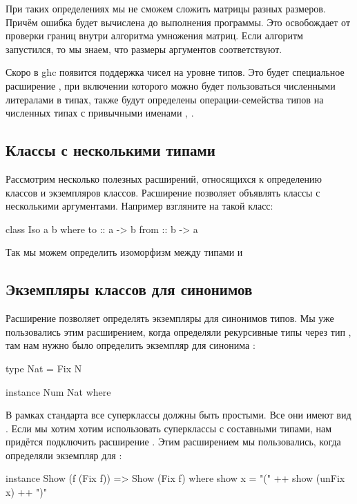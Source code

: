 При таких определениях мы не сможем сложить матрицы
разных размеров. Причём ошибка будет вычислена до 
выполнения программы. Это освобождает от проверки границ
внутри алгоритма умножения матриц. Если алгоритм запустился, то
мы знаем, что размеры аргументов соответствуют.

Скоро в ghc появится поддержка чисел на уровне типов.
Это будет специальное расширение ,
при включении которого можно будет пользоваться численными
литералами в типах, также будут определены 
операции-семейства типов на численных типах
с привычными именами \In{+}, \In{*}. 

\subsection{Классы с несколькими типами}

Рассмотрим несколько полезных расширений, относящихся
к определению классов и экземпляров классов. 
Расширение  позволяет
объявлять классы с несколькими аргументами. Например
взгляните на такой класс:

\begin{code}
class Iso a b where
    to      :: a -> b
    from    :: b -> a
\end{code}

Так мы можем определить изоморфизм между типами  и 

\subsection{Экземпляры классов для синонимов}

Расширение 
позволяет определять экземпляры для синонимов типов.
Мы уже пользовались этим расширением, когда определяли 
рекурсивные типы через тип , там нам нужно было
определить экземпляр  для синонима :

\begin{code}
type Nat = Fix N

instance Num Nat where
\end{code}

В рамках стандарта все суперклассы должны быть простыми.
Все они имеют вид . Если мы хотим хотим использовать
суперклассы с составными типами, нам придётся подключить
расширение . Этим расширением мы пользовались,
когда определяли экземпляр  для :

\begin{code}
instance Show (f (Fix f)) => Show (Fix f) where
    show x = "(" ++ show (unFix x) ++ ")"
\end{code}

